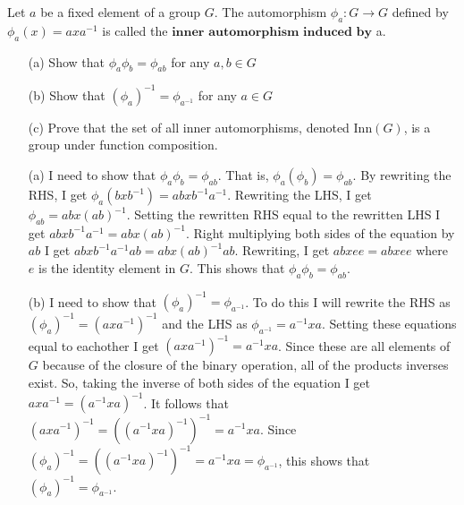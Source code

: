 \documentclass[titlepage]{article}
\begin{document}
\begin{problem}{5}
Let $a$ be a fixed element of a group $G$. The automorphism $\phi_a: G \rightarrow G$ defined by $\phi_a(x) = axa^{-1}$ is called the $\textbf{inner automorphism induced by}$ a.
\begin{itemize}
\item[(a)] Show that $\phi_a\phi_b = \phi_{ab}$ for any $a,b \in G$
\item[(b)] Show that $(\phi_a)^{-1}  = \phi_{a^{-1}}$ for any $a \in G$
\item[(c)] Prove that the set of all inner automorphisms, denoted $\text{Inn}(G)$, is a group under function composition.
\end{itemize}
\end{problem}
\begin{solution}
\vspace{-5mm}
\begin{itemize}
\item[(a)] I need to show that $\phi_a \phi_b = \phi_{ab}$. That is, $\phi_a(\phi_b) = \phi_{ab}$. By rewriting the RHS, I get $\phi_a(bxb^{-1}) = abxb^{-1}a^{-1}$. Rewriting the LHS, I get $\phi_{ab} = abx(ab)^{-1}$. Setting the rewritten RHS equal to the rewritten LHS I get $abxb^{-1}a^{-1} = abx(ab)^{-1}$. Right multiplying both sides of the equation by $ab$ I get $abxb^{-1}a^{-1}ab = abx(ab)^{-1}ab$. Rewriting, I get $abxee = abxee$ where $e$ is the identity element in $G$. This shows that $\phi_a \phi_b = \phi_{ab}$.

\item[(b)] I need to show that $(\phi_a)^{-1} = \phi_{a^{-1}}$. To do this I will rewrite the RHS as $(\phi_a)^{-1} = (axa^{-1})^{-1}$ and the LHS as $\phi_{a^{-1}} = a^{-1}xa$. Setting these equations equal to eachother I get $(axa^{-1})^{-1} = a^{-1}xa$. Since these are all elements of $G$ because of the closure of the binary operation, all of the products inverses exist. So, taking the inverse of both sides of the equation I get $axa^{-1} = (a^{-1}xa)^{-1}$. It follows that $(axa^{-1})^{-1} = ((a^{-1}xa)^{-1})^{-1} = a^{-1}xa$. Since $(\phi_a)^{-1} = ((a^{-1}xa)^{-1})^{-1} = a^{-1}xa = \phi_{a^{-1}}$, this shows that $(\phi_a)^{-1} = \phi_{a^{-1}}$.


\end{itemize}
\end{solution}
\end{document}
